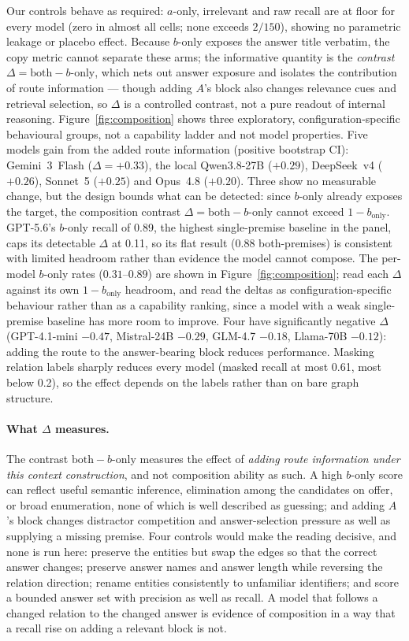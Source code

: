 \documentclass[10pt,twocolumn]{article}
\begin{document}
Our controls behave as required: $a$-only, irrelevant and raw recall are at floor for every
model (zero in almost all cells; none exceeds $2/150$), showing no parametric leakage or placebo
effect. Because $b$-only exposes the answer title verbatim, the copy metric cannot separate these arms;
the informative quantity is the \emph{contrast} $\Delta=\text{both}-b\text{-only}$, which nets out
answer exposure and isolates the contribution of route information --- though adding $A$'s block
also changes relevance cues and retrieval selection, so $\Delta$ is a controlled contrast, not a
pure readout of internal reasoning.
Figure~\ref{fig:composition} shows three exploratory, configuration-specific behavioural groups, not a
capability ladder and not model properties. Five models gain from the added route information
(positive bootstrap CI): Gemini~3~Flash ($\Delta=+0.33$), the local Qwen3.8-27B ($+0.29$),
DeepSeek~v4 ($+0.26$), Sonnet~5 ($+0.25$) and Opus~4.8 ($+0.20$). Three show no measurable
change, but the design bounds what can be detected: since $b$-only already exposes the
target, the composition contrast $\Delta=\text{both}-b\text{-only}$ cannot exceed $1-b_{\text{only}}$.
GPT-5.6's $b$-only recall of 0.89, the highest single-premise baseline in the panel, caps its detectable $\Delta$
at 0.11, so its flat result (0.88 both-premises) is consistent with limited headroom rather than
evidence the model cannot compose. The per-model $b$-only rates ($0.31$--$0.89$) are shown in
Figure~\ref{fig:composition}; read each $\Delta$ against its own $1-b_{\text{only}}$ headroom, and read the
deltas as configuration-specific behaviour rather than as a capability ranking, since a model with a weak
single-premise baseline has more room to improve. Four have significantly
negative $\Delta$ (GPT-4.1-mini $-0.47$, Mistral-24B $-0.29$, GLM-4.7 $-0.18$, Llama-70B
$-0.12$): adding the route to the answer-bearing block reduces performance. Masking relation labels sharply reduces every model (masked recall at most 0.61, most below 0.2), so
the effect depends on the labels rather than on bare graph structure.

\paragraph{What $\Delta$ measures.} The contrast $\text{both}-b\text{-only}$ measures the effect of
\emph{adding route information under this context construction}, and not composition ability as such.
A high $b$-only score can reflect useful semantic inference, elimination among the candidates on offer,
or broad enumeration, none of which is well described as guessing; and adding $A$'s block changes
distractor competition and answer-selection pressure as well as supplying a missing premise. Four
controls would make the reading decisive, and none is run here: preserve the entities but swap the edges
so that the correct answer changes; preserve answer names and answer length while reversing the relation
direction; rename entities consistently to unfamiliar identifiers; and score a bounded answer set with
precision as well as recall. A model that follows a changed relation to the changed answer is evidence
of composition in a way that a recall rise on adding a relevant block is not.
\end{document}
